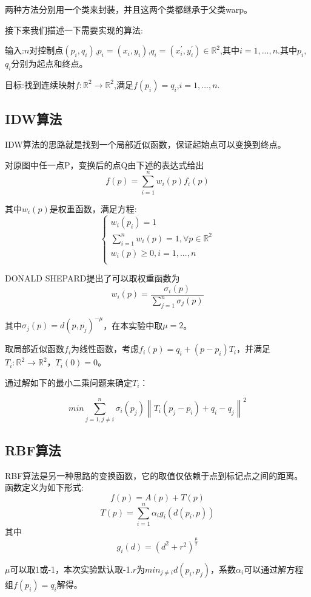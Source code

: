 \documentclass{article}
\begin{document}
    两种方法分别用一个类来封装，并且这两个类都继承于父类warp。
    
    接下来我们描述一下需要实现的算法:
    
    输入:$n$对控制点$(p_i,q_i)$,$p_i=(x_i,y_i)$,$q_i=(x^{'}_i,y^{'}_i) \in \mathbb{R}^2$,其中$i=1,...,n$.其中$p_i$,$q_i$分别为起点和终点。
    
    目标:找到连续映射$f:\mathbb{R}^2 \rightarrow \mathbb{R}^2$,满足$f(p_i)=q_i$,$i=1,...,n$.
	
	\subsection{IDW算法}
	
	IDW算法的思路就是找到一个局部近似函数，保证起始点可以变换到终点。
	
	对原图中任一点P，变换后的点Q由下述的表达式给出
	$$ f(p)=\sum_{i=1}^nw_i(p)f_i(p) $$
	
	其中$w_i(p)$是权重函数，满足方程:
	$$	\left\{ 
	\begin{array}{lc}
		w_i(p_i) = 1 \\
		\sum_{i=1}^nw_i(p)= 1,\forall p\in \mathbb{R}^2  \\
		w_i(p) \geq 0, i=1,...,n \\
	\end{array}
	\right.$$
	
	DONALD SHEPARD提出了可以取权重函数为
	 $$ w_i(p)=\frac{\sigma_i(p)}{\sum_{j=1}^n \sigma_j(p)}$$
	 
	 其中$\sigma_j(p)=d(p,p_j)^{-\mu}$，在本实验中取$\mu = 2$。
	 
	 取局部近似函数$f_i$为线性函数，考虑$f_i(p)=q_i+(p-p_i)T_i$，并满足$T_i:\mathbb{R}^2 \rightarrow \mathbb{R}^2$，$T_i(0)=0$。
	 
	 通过解如下的最小二乘问题来确定$T_i$：
	 
	 $$min \sum_{j=1,j\ne i}^{n}\sigma_i(p_j) \left \| T_i(p_j-p_i)+q_i-q_j \right \|^2 $$
	
	
	\subsection{RBF算法}
	
	RBF算法是另一种思路的变换函数，它的取值仅依赖于点到标记点之间的距离。函数定义为如下形式:
	$$ f(p)=A(p)+T(p) $$
	$$T(p)=\sum_{i=1}^{n}\alpha_ig_i(d(p_i,p))$$
	其中 $$g_i(d)=(d^2+r^2)^{\frac{\mu}{2}}$$
	
	$\mu$可以取1或-1，本次实验默认取-1.$r$为$min_{j \ne i}d(p_i,p_j)$，系数$\alpha_i$可以通过解方程组$f(p_i)=q_i$解得。
	
\end{document}
